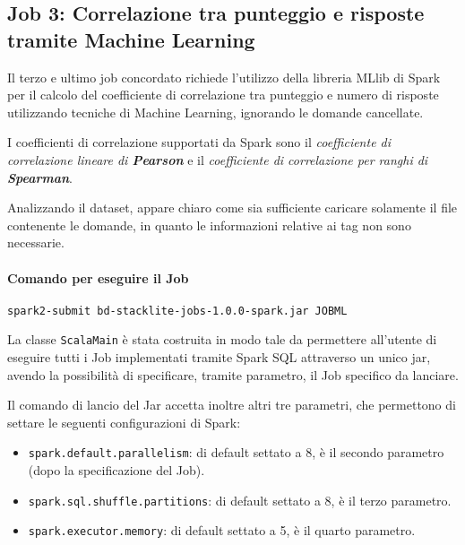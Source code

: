 

\subsection[%
    Job 3: Correlazione tra punteggio e risposte%
  ]{%
    Job 3: Correlazione tra punteggio e risposte tramite Machine Learning%
  }\label{subsec:job3}

  Il terzo e ultimo job concordato richiede l'utilizzo della libreria MLlib di Spark per il calcolo del coefficiente di correlazione
  tra punteggio e numero di risposte utilizzando tecniche di Machine Learning, ignorando le domande cancellate.

  I coefficienti di correlazione supportati da Spark sono il \textit{coefficiente di correlazione lineare di \textbf{Pearson}} e il \textit{coefficiente di correlazione per ranghi di \textbf{Spearman}}.

  Analizzando il dataset, appare chiaro come sia sufficiente caricare solamente il file contenente le domande, in quanto le informazioni relative ai tag non sono necessarie.

  \paragraph{Comando per eseguire il Job}\label{par:job3:cmd}

  \texttt{spark2-submit bd-stacklite-jobs-1.0.0-spark.jar JOBML}

  La classe \texttt{ScalaMain} è stata costruita in modo tale da permettere all'utente di eseguire tutti i Job implementati tramite
  Spark SQL attraverso un unico jar, avendo la possibilità di specificare, tramite parametro, il Job specifico da lanciare.

  Il comando di lancio del Jar accetta inoltre altri tre parametri, che permettono di settare le seguenti configurazioni di Spark\@:
  \begin{itemize}
    \item \texttt{spark.default.parallelism}: di default settato a 8, è il secondo parametro (dopo la specificazione del Job).
    \item \texttt{spark.sql.shuffle.partitions}: di default settato a 8, è il terzo parametro.
    \item \texttt{spark.executor.memory}: di default settato a 5, è il quarto parametro.
  \end{itemize}

